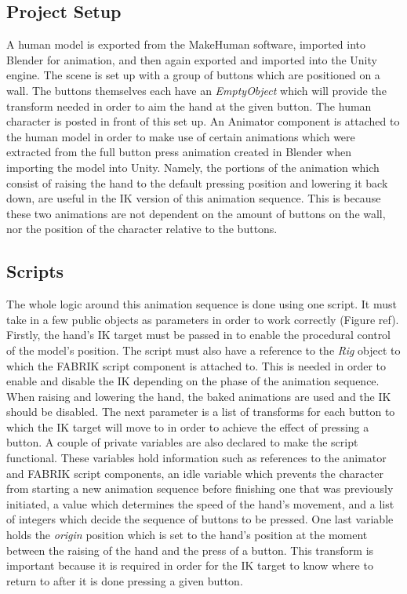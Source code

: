 \subsection{Project Setup}
A human model is exported from the MakeHuman software, imported into Blender for
animation, and then again exported and imported into the Unity engine. The scene
is set up with a group of buttons which are positioned on a wall. The buttons
themselves each have an \textit{EmptyObject} which will provide the transform
needed in order to aim the hand at the given button. The human character is
posted in front of this set up. An Animator component is attached to the human
model in order to make use of certain animations which were extracted from the
full button press animation created in Blender when importing the model into
Unity. Namely, the portions of the animation which consist of raising the hand
to the default pressing position and lowering it back down, are useful in the IK
version of this animation sequence. This is because these two animations are not
dependent on the amount of buttons on the wall, nor the position of the
character relative to the buttons.
\subsection{Scripts}
The whole logic around this animation sequence is done using one script. It must
take in a few public objects as parameters in order to work correctly (Figure
ref). Firstly, the hand's IK target must be passed in to enable the procedural
control of the model's position. The script must also have a reference to the
\textit{Rig} object to which the FABRIK script component is attached to. This is
needed in order to enable and disable the IK depending on the phase of the
animation sequence. When raising and lowering the hand, the baked animations are
used and the IK should be disabled. The next parameter is a list of transforms
for each button to which the IK target will move to in order to achieve the
effect of pressing a button. A couple of private variables are also declared to
make the script functional. These variables hold information such as references
to the animator and FABRIK script components, an idle variable which prevents
the character from starting a new animation sequence before finishing one that
was previously initiated, a value which determines the speed of the hand's
movement, and a list of integers which decide the sequence of buttons to be
pressed. One last variable holds the \textit{origin} position which is set to
the hand's position at the moment between the raising of the hand and the press
of a button. This transform is important because it is required in order for the
IK target to know where to return to after it is done pressing a given button. 

